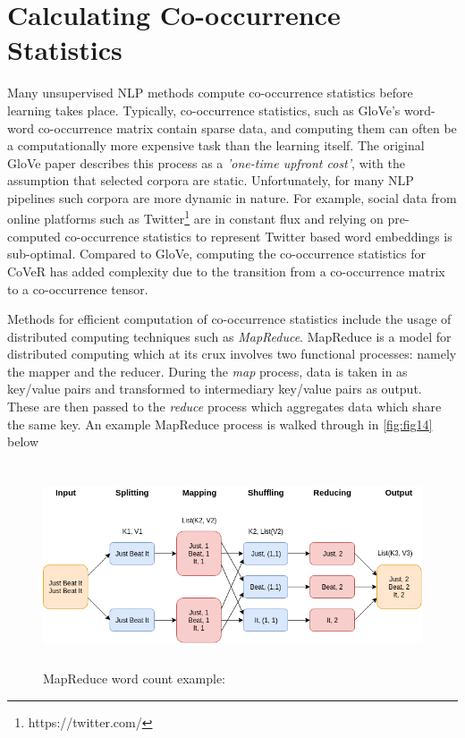 \section{Calculating Co-occurrence Statistics}
Many unsupervised NLP methods compute co-occurrence statistics before learning takes place. Typically, co-occurrence statistics, such as GloVe's word-word co-occurrence matrix contain sparse data, and computing them can often be a computationally more expensive task than the learning itself. The original GloVe paper describes this process as a \textit{'one-time upfront cost'}, with the assumption that selected corpora are static. Unfortunately, for many NLP pipelines such corpora are more dynamic in nature. For example, social data from online platforms such as Twitter\footnote{https://twitter.com/} are in constant flux and relying on pre-computed co-occurrence statistics to represent Twitter based word embeddings is sub-optimal. Compared to GloVe, computing the co-occurrence statistics for CoVeR has added complexity due to the transition from a co-occurrence matrix to a co-occurrence tensor.

\noindent
\newline
Methods for efficient computation of co-occurrence statistics include the usage of distributed computing techniques such as \textit{MapReduce}. MapReduce is a model for distributed computing which at its crux involves two functional processes: namely the mapper and the reducer. During the \textit{map} process, data is taken in as key/value pairs and transformed to intermediary key/value pairs as output. These are then passed to the \textit{reduce} process which aggregates data which share the same key. An example MapReduce process is walked through in \autoref{fig:fig14} below 

\begin{figure}[h]
	\includegraphics[width=14cm, height=6cm]{./figures/fig14}
	\centering
	\caption[MapReduce Word Count Example]{MapReduce word count example: }
	\label{fig:fig14}
\end{figure}

